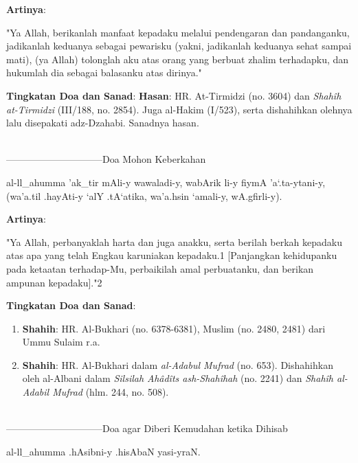 \documentclass[a4paper,12pt]{article}
\begin{document}
\noindent
\textbf{Artinya}:
\par
\indent
"Ya Allah, berikanlah manfaat kepadaku melalui pendengaran dan pandanganku,
jadikanlah keduanya sebagai pewarisku (yakni, jadikanlah keduanya sehat 
sampai mati), (ya Allah) tolonglah aku atas orang yang berbuat zhalim 
terhadapku, dan hukumlah dia sebagai balasanku atas dirinya."\\
\par
\noindent
\textbf{Tingkatan Doa dan Sanad}: \textbf{Hasan}: HR. At-Tirmidzi (no. 
3604) dan \textit{Shah\^{i}h at-Tirmidzi} (III/188, no. 2854). Juga 
al-Hakim (I/523), serta dishahihkan olehnya lalu disepakati adz-Dzahabi. 
Sanadnya hasan.\\\\
\par
{}------------------------------Doa Mohon Keberkahan
\begin{arabtext}
\noindent
al-ll_ahumma 'ak_tir mAli-y wawaladi-y, wabArik li-y fiymA 'a`.ta-ytani-y, 
(wa'a.til .hayAti-y `alY .tA`atika, wa'a.hsin `amali-y, wA.gfirli-y).\\
\end{arabtext}
\noindent
\textbf{Artinya}:
\par
\indent
"Ya Allah, perbanyaklah harta dan juga anakku, serta berilah berkah 
kepadaku atas apa yang telah Engkau karuniakan kepadaku.{\scriptsize 1}
[Panjangkan kehidupanku pada ketaatan terhadap-Mu, perbaikilah amal 
perbuatanku, dan berikan ampunan kepadaku]."{\scriptsize 2}\\
\par
\noindent
\textbf{Tingkatan Doa dan Sanad}:
\begin{enumerate}
\item \textbf{Shahih}: HR. Al-Bukhari (no. 6378-6381), Muslim (no. 2480, 
2481) dari Ummu Sulaim r.a.
\item \textbf{Shahih}: HR. Al-Bukhari dalam \textit{al-Adabul Mufrad} (no. 
653). Dishahihkan oleh al-Albani dalam \textit{Silsilah Ah\^{a}d\^{i}ts 
ash-Shah\^{i}hah} (no. 2241) dan \textit{Shah\^{i}h al-Adabil Mufrad} 
(hlm. 244, no. 508).\\\\
\end{enumerate}
\par
{}------------------------------Doa agar Diberi Kemudahan ketika Dihisab
\begin{arabtext}
\noindent
al-ll_ahumma .hAsibni-y .hisAbaN yasi-yraN.\\
\end{arabtext}
\end{document}
